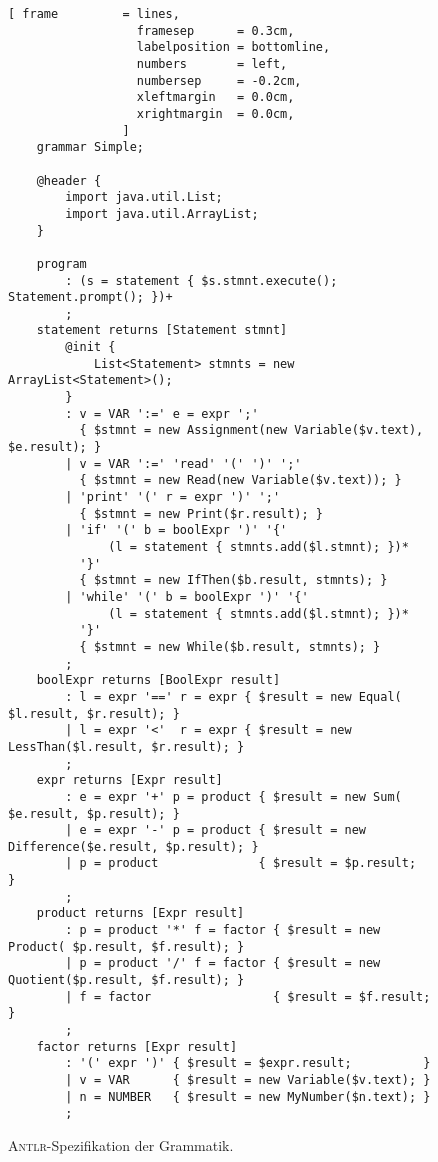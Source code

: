 \begin{figure}[!ht]
\centering
\begin{Verbatim}[ frame         = lines, 
                  framesep      = 0.3cm, 
                  labelposition = bottomline,
                  numbers       = left,
                  numbersep     = -0.2cm,
                  xleftmargin   = 0.0cm,
                  xrightmargin  = 0.0cm,
                ]
    grammar Simple;
    
    @header {
        import java.util.List;
        import java.util.ArrayList;
    }
    
    program 
        : (s = statement { $s.stmnt.execute(); Statement.prompt(); })+
        ;
    statement returns [Statement stmnt]
        @init { 
            List<Statement> stmnts = new ArrayList<Statement>(); 
        }
        : v = VAR ':=' e = expr ';'     
          { $stmnt = new Assignment(new Variable($v.text), $e.result); }
        | v = VAR ':=' 'read' '(' ')' ';'     
          { $stmnt = new Read(new Variable($v.text)); }
        | 'print' '(' r = expr ')' ';' 
          { $stmnt = new Print($r.result); }
        | 'if' '(' b = boolExpr ')' '{' 
              (l = statement { stmnts.add($l.stmnt); })*
          '}' 
          { $stmnt = new IfThen($b.result, stmnts); }
        | 'while' '(' b = boolExpr ')' '{' 
              (l = statement { stmnts.add($l.stmnt); })*
          '}' 
          { $stmnt = new While($b.result, stmnts); }
        ;
    boolExpr returns [BoolExpr result]
        : l = expr '==' r = expr { $result = new Equal(   $l.result, $r.result); } 
        | l = expr '<'  r = expr { $result = new LessThan($l.result, $r.result); }
        ;
    expr returns [Expr result]
        : e = expr '+' p = product { $result = new Sum(       $e.result, $p.result); }
        | e = expr '-' p = product { $result = new Difference($e.result, $p.result); }
        | p = product              { $result = $p.result;                            }
        ;
    product returns [Expr result]
        : p = product '*' f = factor { $result = new Product( $p.result, $f.result); }
        | p = product '/' f = factor { $result = new Quotient($p.result, $f.result); }
        | f = factor                 { $result = $f.result;                          }
        ;    
    factor returns [Expr result]
        : '(' expr ')' { $result = $expr.result;          }
        | v = VAR      { $result = new Variable($v.text); }
        | n = NUMBER   { $result = new MyNumber($n.text); }
        ;
\end{Verbatim}
\vspace*{-0.3cm} %
\caption{\textsc{Antlr}-Spezifikation der Grammatik.}
\label{fig:Simple.g}
\end{figure}

